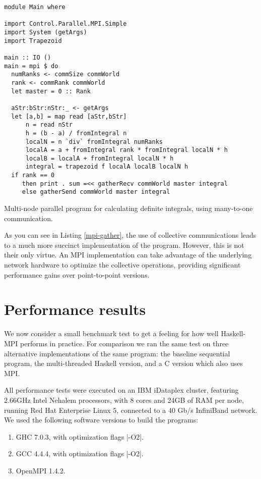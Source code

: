 \documentclass{tmr}
\begin{document}
\begin{listing}
\begin{Verbatim}
module Main where

import Control.Parallel.MPI.Simple
import System (getArgs)
import Trapezoid

main :: IO ()
main = mpi $ do
  numRanks <- commSize commWorld
  rank <- commRank commWorld
  let master = 0 :: Rank

  aStr:bStr:nStr:_ <- getArgs
  let [a,b] = map read [aStr,bStr]
      n = read nStr
      h = (b - a) / fromIntegral n
      localN = n `div` fromIntegral numRanks
      localA = a + fromIntegral rank * fromIntegral localN * h
      localB = localA + fromIntegral localN * h
      integral = trapezoid f localA localB localN h
  if rank == 0
     then print . sum =<< gatherRecv commWorld master integral
     else gatherSend commWorld master integral
\end{Verbatim}
\caption{Multi-node parallel program for calculating definite
  integrals, using many-to-one communication. \label{mpi-gather}}
\end{listing}

As you can see in Listing \ref{mpi-gather},
the use of collective communications
leads to a much more succinct implementation of the program.
However, this is not their only virtue. An MPI implementation
can take advantage of the underlying network hardware to optimize
the collective operations, providing significant performance
gains over point-to-point versions.

\section{Performance results}

We now consider a small benchmark test to get a feeling for how well Haskell-MPI performs
in practice. For comparison we ran the same test on three alternative implementations
of the same program: the baseline sequential program,
the multi-threaded Haskell version, and a C version which also uses MPI.

All performance tests were executed on an IBM iDataplex cluster,
featuring 2.66GHz Intel Nehalem processors, with 8 cores and
24GB of RAM per node, running Red Hat Enterprise Linux 5, connected
to a 40 Gb/s InfiniBand network. We used the following software
versions to build the programs:
\begin{enumerate}
   \item GHC 7.0.3, with optimization flags |-O2|.
   \item GCC 4.4.4, with optimization flags |-O2|.
   \item OpenMPI 1.4.2.
\end{enumerate}
\end{document}
